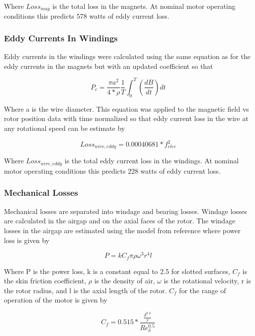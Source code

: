 \documentclass[]{aiaa-tc}%
\begin{document}
Where $Loss_{mag}$ is the total loss in the magnets. At nominal motor operating conditions this predicts 578 watts of eddy current loss.

\subsubsection{Eddy Currents In Windings}
Eddy currents in the windings were calculated using the same equation as for the eddy currents in the magnets but with an updated coefficient so that

\begin{equation}
P_{c} = \frac{\pi a^2}{4*\rho}\frac{1}{T}\int_{0}^{T}(\frac{dB}{dt})dt
\label{eq:EddyLoss3}
\end{equation}

Where a is the wire diameter. This equation was applied to the magnetic field vs rotor position data with time normalized so that eddy current loss in the wire at any rotational speed can be estimate by

\begin{equation}
Loss_{wire,eddy} = 0.00040681*f_{elec}^{2}
\label{eq:EddyLoss4}
\end{equation}

Where $Loss_{wire,eddy}$ is the total eddy current loss in the windings. At nominal motor operating conditions this predicts 228 watts of eddy current loss.

\subsubsection{Mechanical Losses}

Mechanical losses are separated into windage and bearing losses. Windage losses are calculated in the airgap and on the axial faces of the rotor. 
The windage losses in the airgap are estimated using the model from reference \cite{Huang} where power loss is given by

\begin{equation}
P = kC_{f}\pi\rho\omega^{3}r^{4}l
\label{eq:Windage}
\end{equation}

Where P is the power loss, k is a constant equal to 2.5 for slotted surfaces, $C_{f}$ is the skin friction coefficient, $\rho$ is the density of air, $\omega$ is the rotational velocity, r is the rotor radius, and l is the axial length of the rotor. $C_{f}$ for the range of operation of the motor is given by

\begin{equation}
C_{f}= 0.515*\frac{\frac{\delta^{0.3}}{r}}{Re_{\delta}^{0.5}}
\label{eq:Cf}
\end{equation}
\end{document}
